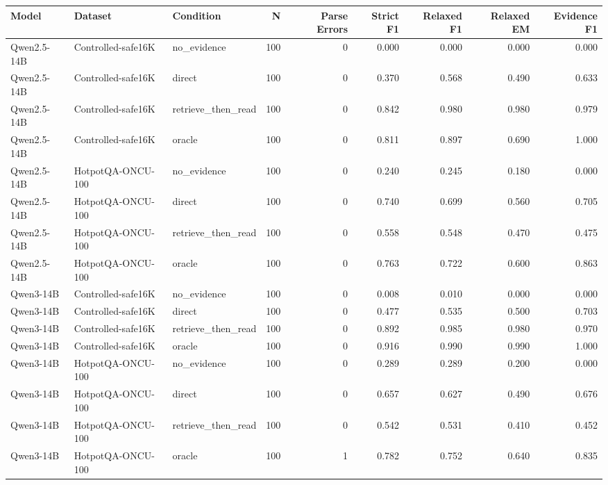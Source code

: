 \begin{tabular}{lllrrrrrr}
\toprule
Model & Dataset & Condition & N & Parse Errors & Strict F1 & Relaxed F1 & Relaxed EM & Evidence F1 \\
\midrule
Qwen2.5-14B & Controlled-safe16K & no_evidence & 100 & 0 & 0.000 & 0.000 & 0.000 & 0.000 \\
Qwen2.5-14B & Controlled-safe16K & direct & 100 & 0 & 0.370 & 0.568 & 0.490 & 0.633 \\
Qwen2.5-14B & Controlled-safe16K & retrieve_then_read & 100 & 0 & 0.842 & 0.980 & 0.980 & 0.979 \\
Qwen2.5-14B & Controlled-safe16K & oracle & 100 & 0 & 0.811 & 0.897 & 0.690 & 1.000 \\
Qwen2.5-14B & HotpotQA-ONCU-100 & no_evidence & 100 & 0 & 0.240 & 0.245 & 0.180 & 0.000 \\
Qwen2.5-14B & HotpotQA-ONCU-100 & direct & 100 & 0 & 0.740 & 0.699 & 0.560 & 0.705 \\
Qwen2.5-14B & HotpotQA-ONCU-100 & retrieve_then_read & 100 & 0 & 0.558 & 0.548 & 0.470 & 0.475 \\
Qwen2.5-14B & HotpotQA-ONCU-100 & oracle & 100 & 0 & 0.763 & 0.722 & 0.600 & 0.863 \\
Qwen3-14B & Controlled-safe16K & no_evidence & 100 & 0 & 0.008 & 0.010 & 0.000 & 0.000 \\
Qwen3-14B & Controlled-safe16K & direct & 100 & 0 & 0.477 & 0.535 & 0.500 & 0.703 \\
Qwen3-14B & Controlled-safe16K & retrieve_then_read & 100 & 0 & 0.892 & 0.985 & 0.980 & 0.970 \\
Qwen3-14B & Controlled-safe16K & oracle & 100 & 0 & 0.916 & 0.990 & 0.990 & 1.000 \\
Qwen3-14B & HotpotQA-ONCU-100 & no_evidence & 100 & 0 & 0.289 & 0.289 & 0.200 & 0.000 \\
Qwen3-14B & HotpotQA-ONCU-100 & direct & 100 & 0 & 0.657 & 0.627 & 0.490 & 0.676 \\
Qwen3-14B & HotpotQA-ONCU-100 & retrieve_then_read & 100 & 0 & 0.542 & 0.531 & 0.410 & 0.452 \\
Qwen3-14B & HotpotQA-ONCU-100 & oracle & 100 & 1 & 0.782 & 0.752 & 0.640 & 0.835 \\
\bottomrule
\end{tabular}
